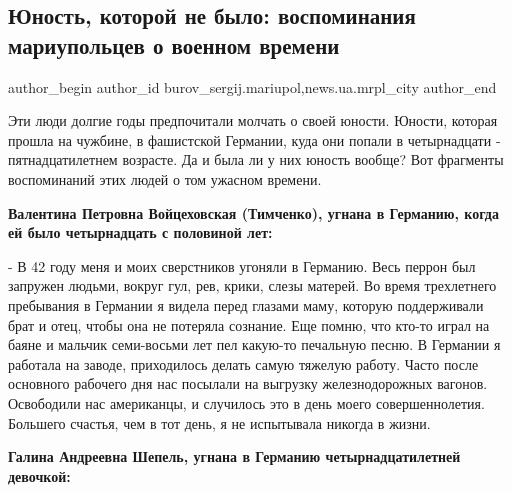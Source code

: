  
 
 
 
 
 
\subsection{Юность, которой не было: воспоминания мариупольцев о военном времени}
\label{sec:11_05_2019.stz.news.ua.mrpl_city.1.junost_kotoroj_ne_bylo_vospominania_vojna}
 
\ifcmt
 author_begin
   author_id burov_sergij.mariupol,news.ua.mrpl_city
 author_end
\fi


Эти люди долгие годы предпочитали молчать о своей юности. Юности, которая
прошла на чужбине, в фашистской Германии, куда они попали в четырнадцати -
пятнадцатилетнем возрасте. Да и была ли у них юность вообще? Вот фрагменты
воспоминаний этих людей о том ужасном времени.

\textbf{Валентина Петровна Войцеховская (Тимченко), угнана в Германию, когда ей было
четырнадцать с половиной лет:}

- В 42 году меня и моих сверстников угоняли в Германию. Весь перрон был
запружен людьми, вокруг гул, рев, крики, слезы матерей. Во время трехлетнего
пребывания в Германии я видела перед глазами маму, которую поддерживали брат и
отец, чтобы она не потеряла сознание. Еще помню, что кто-то играл на баяне и
мальчик семи-восьми лет пел какую-то печальную песню. В Германии я работала на
заводе, приходилось делать самую тяжелую работу. Часто после основного рабочего
дня нас посылали на выгрузку железнодорожных вагонов. Освободили нас
американцы, и случилось это в день моего совершеннолетия. Большего счастья, чем
в тот день, я не испытывала никогда в жизни.

\textbf{Галина Андреевна Шепель, угнана в Германию четырнадцатилетней девочкой:}

